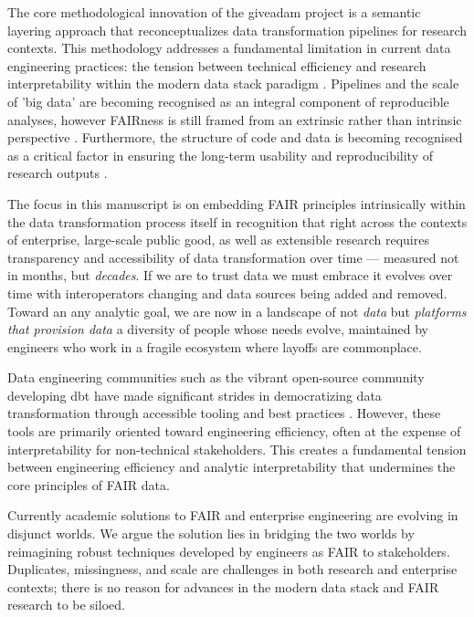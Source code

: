 \documentclass{article}
\begin{document}
The core methodological innovation of the giveadam project is a semantic layering approach that reconceptualizes data transformation pipelines for research contexts. This methodology addresses a fundamental limitation in current data engineering practices: the tension between technical efficiency and research interpretability within the modern data stack paradigm \cite{prakashWhatDefinesModern2023}. Pipelines and the scale of 'big data' are becoming recognised as an integral component of reproducible analyses, however FAIRness is still framed from an extrinsic rather than intrinsic perspective \cite{leipzigRoleMetadataReproducible2021}. Furthermore, the structure of code and data is becoming recognised as a critical factor in ensuring the long-term usability and reproducibility of research outputs \cite{trisovicRepositoryApproachesImproving2021}. 

The focus in this manuscript is on embedding FAIR principles intrinsically within the data transformation process itself in recognition that right across the contexts of enterprise, large-scale public good, as well as extensible research requires transparency and accessibility of data transformation over time --- measured not in months, but \textit{decades}. If we are to trust data we must embrace it evolves over time with interoperators changing and data sources being added and removed. Toward an any analytic goal, we are now in a landscape of not \textit{data} but \textit{platforms that provision data} a diversity of people whose needs evolve, maintained by engineers who work in a fragile ecosystem where layoffs are commonplace.

Data engineering communities such as the vibrant open-source community developing dbt \cite{dbt_core} have made significant strides in democratizing data transformation through accessible tooling and best practices \cite{dbt_docs_structure}. However, these tools are primarily oriented toward engineering efficiency, often at the expense of interpretability for non-technical stakeholders. This creates a fundamental tension between engineering efficiency and analytic interpretability that undermines the core principles of FAIR data. 

Currently academic solutions to FAIR and enterprise engineering are evolving in disjunct worlds. We argue the solution lies in bridging the two worlds by reimagining robust techniques developed by engineers as FAIR to stakeholders. Duplicates, missingness, and scale are challenges in both research and enterprise contexts; there is no reason for advances in the modern data stack and FAIR research to be siloed.
\end{document}
